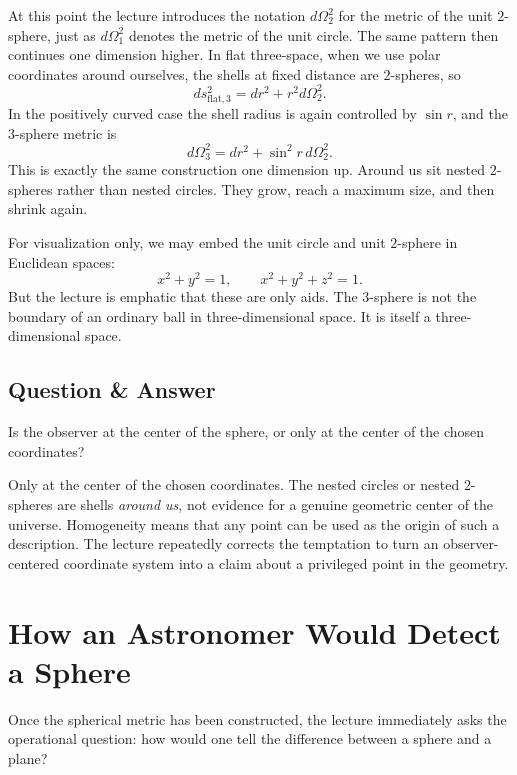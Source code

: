 At this point the lecture introduces the notation \(d\Omega_2^2\) for the metric of the unit \(2\)-sphere, just as \(d\Omega_1^2\) denotes the metric of the unit circle. The same pattern then continues one dimension higher. In flat three-space, when we use polar coordinates around ourselves, the shells at fixed distance are \(2\)-spheres, so
\begin{equation}
ds_{\text{flat},3}^2 = dr^2 + r^2 d\Omega_2^2.
\end{equation}
In the positively curved case the shell radius is again controlled by \(\sin r\), and the \(3\)-sphere metric is
\begin{equation}
d\Omega_3^2 = dr^2 + \sin^2 r\, d\Omega_2^2.
\end{equation}
This is exactly the same construction one dimension up. Around us sit nested \(2\)-spheres rather than nested circles. They grow, reach a maximum size, and then shrink again.

For visualization only, we may embed the unit circle and unit \(2\)-sphere in Euclidean spaces:
\begin{equation}
x^2+y^2=1,
\qquad
x^2+y^2+z^2=1.
\end{equation}
But the lecture is emphatic that these are only aids. The \(3\)-sphere is not the boundary of an ordinary ball in three-dimensional space. It is itself a three-dimensional space.

\subsection{Question \& Answer}

Is the observer at the center of the sphere, or only at the center of the chosen coordinates?

Only at the center of the chosen coordinates. The nested circles or nested \(2\)-spheres are shells \emph{around us}, not evidence for a genuine geometric center of the universe. Homogeneity means that any point can be used as the origin of such a description. The lecture repeatedly corrects the temptation to turn an observer-centered coordinate system into a claim about a privileged point in the geometry.

\section{How an Astronomer Would Detect a Sphere}

Once the spherical metric has been constructed, the lecture immediately asks the operational question: how would one tell the difference between a sphere and a plane?

